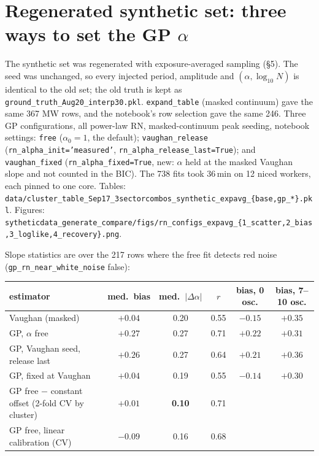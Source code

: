 \documentclass[11pt]{article}
\newcommand{\code}[1]{\texttt{#1}}
\begin{document}
\section{Regenerated synthetic set: three ways to set the GP $\alpha$}

The synthetic set was regenerated with exposure-averaged sampling (\S5). The seed was
unchanged, so every injected period, amplitude and $(\alpha,\log_{10}N)$ is identical to the
old set; the old truth is kept as \code{ground\_truth\_Aug20\_interp30.pkl}.
\code{expand\_table} (masked continuum) gave the same 367 MW rows, and the notebook's row
selection gave the same 246. Three GP configurations, all power-law RN, masked-continuum
peak seeding, notebook settings:
\code{free} ($\alpha_0=1$, the default); \code{vaughan\_release}
(\code{rn\_alpha\_init='measured'}, \code{rn\_alpha\_release\_last=True}); and
\code{vaughan\_fixed} (\code{rn\_alpha\_fixed=True}, new: $\alpha$ held at the masked
Vaughan slope and not counted in the BIC). The 738 fits took 36\,min on 12 niced workers,
each pinned to one core.
Tables: \code{data/cluster\_table\_Sep17\_3sectorcombos\_synthetic\_expavg\_\{base,gp\_*\}.pkl}.
Figures: \code{sytheticdata\_generate\_compare/figs/rn\_configs\_expavg\_\{1\_scatter,2\_bias,3\_loglike,4\_recovery\}.png}.

Slope statistics are over the 217 rows where the free fit detects red noise
(\code{gp\_rn\_near\_white\_noise} false):

\begin{center}
\begin{tabular}{lccccc}
\toprule
estimator & med.\ bias & med.\ $|\Delta\alpha|$ & $r$ & bias, 0 osc. & bias, 7--10 osc. \\
\midrule
Vaughan (masked)                 & $+0.04$ & 0.20 & 0.55 & $-0.15$ & $+0.35$ \\
GP, $\alpha$ free                & $+0.27$ & 0.27 & 0.71 & $+0.22$ & $+0.31$ \\
GP, Vaughan seed, release last   & $+0.26$ & 0.27 & 0.64 & $+0.21$ & $+0.36$ \\
GP, fixed at Vaughan             & $+0.04$ & 0.19 & 0.55 & $-0.14$ & $+0.30$ \\
\midrule
GP free $-$ constant offset (2-fold CV by cluster) & $+0.01$ & \textbf{0.10} & 0.71 & & \\
GP free, linear calibration (CV)                  & $-0.09$ & 0.16 & 0.68 & & \\
\bottomrule
\end{tabular}
\end{center}
\end{document}
